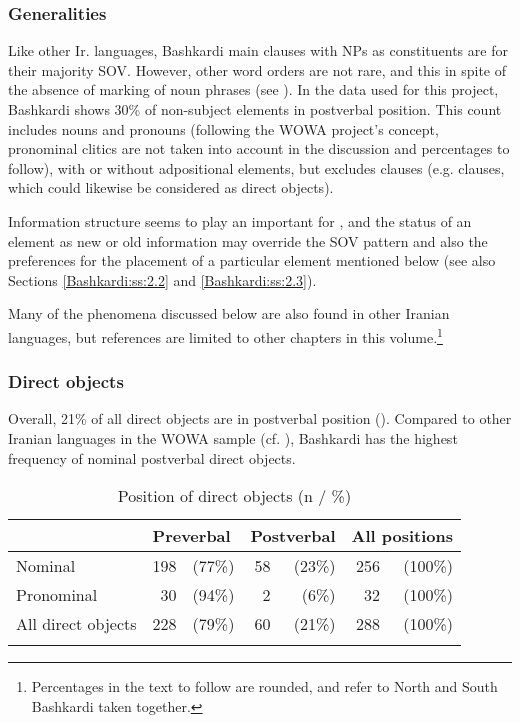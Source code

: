 \documentclass[output=paper,colorlinks,citecolor=brown]{langscibook}
\begin{document}
\subsubsection{Generalities}\label{Bashkardi:ss:2.4.0}

Like other Ir. languages, Bashkardi main clauses with NPs as constituents are for their majority SOV. However, other word orders are not rare, and this in spite of the absence of marking of noun phrases (see ). In the data used for this project, Bashkardi shows 30\% of non-subject elements in postverbal position. This count includes nouns and pronouns (following the WOWA project's concept, pronominal clitics are not taken into account in the discussion and percentages to follow), with or without adpositional elements, but excludes clauses (e.g.  clauses, which could likewise be considered as direct objects).

Information structure seems to play an important  for , and the status of an element as new or old information may override the SOV pattern and also the preferences for the placement of a particular element mentioned below (see also Sections \ref{Bashkardi:ss:2.2} and \ref{Bashkardi:ss:2.3}). 

Many of the phenomena discussed below are also found in other Iranian languages, but references are limited to other chapters in this volume.\footnote{
Percentages in the text to follow are rounded, and refer to North and South Bashkardi taken together.
}

\subsubsection{Direct objects}\label{Bashkardi:ss:2.4.1}

Overall, 21\% of all direct objects are in postverbal position (). Compared to other Iranian languages in the WOWA sample (cf. ), Bashkardi has the highest frequency of nominal postverbal direct objects.

\begin{table}
 \centering
 \begin{tabular}{lrrrrrr}
 \lsptoprule
& \multicolumn{2}{l}{Preverbal} & \multicolumn{2}{l}{Postverbal} & \multicolumn{2}{l}{All positions} \\
\midrule
Nominal & 198 & (77\%) & 58 & (23\%) & 256 & (100\%) \\
Pronominal & 30 & (94\%) & 2 & (6\%) & 32 & (100\%) \\
\midrule
All direct objects & 228 & (79\%) & 60 & (21\%) & 288 & (100\%) \\
\lspbottomrule
 \end{tabular}
 \caption{Position of direct objects (n / \%)}
 \label{Bashkardi:tab:1}
\end{table}
\end{document}
